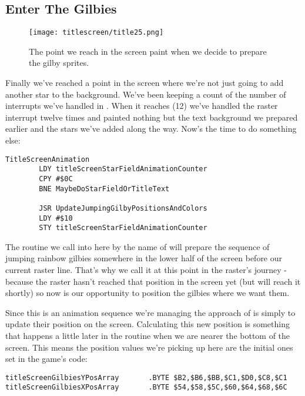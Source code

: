 \subsection{Enter The Gilbies}
\begin{figure}[H]
    \centering
      \texttt{[image: titlescreen/title25.png]}%
\caption{The point we reach in the screen paint when we decide to prepare the gilby sprites.}
\end{figure}

Finally we've reached a point in the screen where we're not just going to add another star to the background.
We've been keeping a count of the number of interrupts we've handled in .
When it reaches  (12) we've handled the raster interrupt twelve times and painted nothing but the
text background we prepared earlier and the stars we've added along the way. Now's the time to do something else:

\begin{lstlisting}
TitleScreenAnimation
        LDY titleScreenStarFieldAnimationCounter
        CPY #$0C
        BNE MaybeDoStarFieldOrTitleText

        JSR UpdateJumpingGilbyPositionsAndColors
        LDY #$10
        STY titleScreenStarFieldAnimationCounter
\end{lstlisting}

The routine we call into here by the name of  will prepare the sequence
of jumping rainbow gilbies somewhere in the lower half of the screen before our current raster line. That's why we
call it at this point in the raster's journey - because the raster hasn't reached that position in the screen yet
(but will reach it shortly) so now is our opportunity to position the gilbies where we want them. 

Since this is an animation sequence we're managing the approach of  is
simply to update their position on the screen. Calculating this new position is something that happens a little later
in the routine  when we are nearer the bottom of the screen. This means the
position values we're picking up here are the initial ones set in the game's code:

\begin{lstlisting}
titleScreenGilbiesYPosArray       .BYTE $B2,$B6,$BB,$C1,$D0,$C8,$C1
titleScreenGilbiesXPosArray       .BYTE $54,$58,$5C,$60,$64,$68,$6C
\end{lstlisting}

